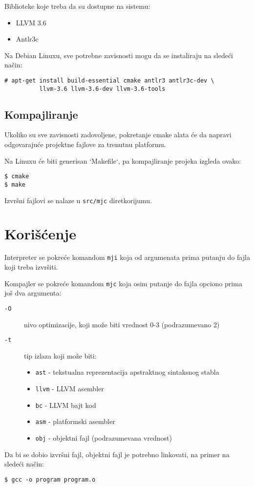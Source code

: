 Biblioteke koje treba da su dostupne na sistemu:
\begin{itemize}
\item LLVM 3.6
\item Antlr3c
\end{itemize}

Na Debian Linuxu, sve potrebne zavisnosti mogu da se instaliraju na sledeći način:

\begin{lstlisting}
# apt-get install build-essential cmake antlr3 antlr3c-dev \
          llvm-3.6 llvm-3.6-dev llvm-3.6-tools
\end{lstlisting}

\subsection*{Kompajliranje}

Ukoliko su sve zavisnosti zadovoljene, pokretanje cmake alata će da napravi
odgovarajuće projektne fajlove za trenutnu platformu.

Na Linuxu će biti generisan `Makefile`, pa kompajliranje projeka izgleda ovako:

\begin{lstlisting}
$ cmake
$ make
\end{lstlisting}

Izvršni fajlovi se nalaze u \texttt{src/mjc} diretkorijumu.

\section{Korišćenje}

Interpreter se pokreće komandom \texttt{mji} koja od argumenata prima putanju do fajla koji treba izvršiti.

Kompajler se pokreće komandom \texttt{mjc} koja osim putanje do fajla opciono prima još dva argumenta:
\begin{description}
\item[\texttt{-O}] nivo optimizacije, koji može biti vrednost 0-3 (podrazumevano 2)
\item[\texttt{-t}] tip izlaza koji može biti:

\begin{itemize}
    \item \texttt{ast} - tekstualna reprezentacija apstraktnog sintaksnog stabla
    \item \texttt{llvm} - LLVM asembler
    \item \texttt{bc} - LLVM bajt kod
    \item \texttt{asm} - platformski asembler
    \item \texttt{obj} - objektni fajl (podrazumevana vrednost)
\end{itemize}
\end{description}

Da bi se dobio izvršni fajl, objektni fajl je potrebno linkovati, na primer na sledeći način:

\begin{lstlisting}
$ gcc -o program program.o
\end{lstlisting}
